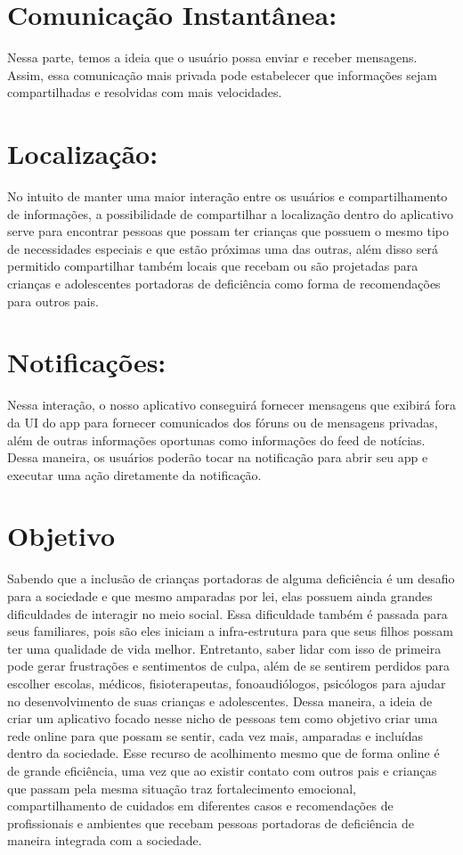 \begin{apendicesenv}
	\section{Comunicação Instantânea: }
	Nessa parte, temos a ideia que o usuário possa enviar e receber mensagens. Assim, essa comunicação mais privada pode estabelecer que informações sejam compartilhadas e resolvidas com mais velocidades. 
	
	\section{Localização: }
	No intuito de manter uma maior interação entre os usuários e compartilhamento de informações, a possibilidade de compartilhar a localização dentro do aplicativo serve para encontrar pessoas que possam ter crianças que possuem o mesmo tipo de  necessidades especiais e que estão próximas uma das outras, além disso será permitido compartilhar também locais que recebam ou são projetadas para crianças e adolescentes portadoras de deficiência como forma de recomendações para outros pais. 
	
	\section{Notificações: }
	Nessa interação, o nosso aplicativo conseguirá fornecer mensagens que exibirá fora da UI do app para fornecer comunicados dos fóruns ou de mensagens privadas, além de outras informações oportunas como informações do feed de notícias. Dessa maneira, os usuários poderão tocar na notificação para abrir seu app e executar uma ação diretamente da notificação. 
	
	
	
	\section{Objetivo}
	Sabendo que a inclusão de crianças portadoras de alguma deficiência é um desafio para a sociedade e que mesmo amparadas por lei, elas possuem ainda grandes dificuldades de interagir no meio social. Essa dificuldade também é passada para seus familiares, pois são eles iniciam a infra-estrutura para que seus filhos possam ter uma qualidade de vida melhor. Entretanto, saber lidar com isso de primeira pode gerar frustrações e sentimentos de culpa, além de se sentirem perdidos para escolher escolas, médicos, fisioterapeutas, fonoaudiólogos, psicólogos para ajudar no desenvolvimento de suas crianças e adolescentes.  Dessa maneira, a ideia de criar um aplicativo focado nesse nicho de pessoas tem como objetivo criar uma rede online para que possam se sentir, cada vez mais, amparadas e incluídas dentro da sociedade. Esse recurso de acolhimento mesmo que de forma online é de grande eficiência, uma vez que ao existir contato com outros pais e crianças que passam pela mesma situação traz fortalecimento emocional, compartilhamento de cuidados em diferentes casos e recomendações de profissionais e ambientes que recebam pessoas portadoras de deficiência de maneira integrada com a sociedade.
	

\end{apendicesenv}
